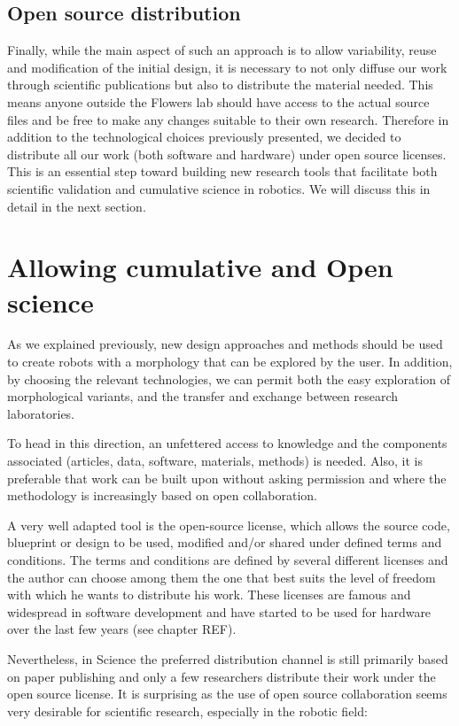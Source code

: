 \subsection{Open source distribution} %

Finally, while the main aspect of such an approach is to allow variability, reuse and modification of the initial design, it is necessary to not only diffuse our work through scientific publications but also to distribute the material needed.
This means anyone outside the Flowers lab should have access to the actual source files and be free to make any changes suitable to their own research. Therefore in addition to the technological choices previously presented, we decided to distribute all our work (both software and hardware) under open source licenses.
This is an essential step toward building new research tools that facilitate both scientific validation and cumulative science in robotics. We will discuss this in detail in the next section.


\section{Allowing cumulative and Open science} %
\label{sec:allow-cumulative-science}
As we explained previously, new design approaches and methods should be used to create robots with a morphology that can be explored by the user. In addition, by choosing the relevant technologies, we can permit both  the easy exploration of morphological variants, and the transfer and exchange between research laboratories.

To head in this direction, an unfettered access to knowledge and the components associated (articles, data, software, materials, methods) is needed. Also, it is preferable that work can be built upon without asking permission and where the methodology is increasingly based on open collaboration.

A very well adapted tool is the open-source license, which allows the source code, blueprint or design to be used, modified and/or shared under defined terms and conditions. The terms and conditions are defined by several different licenses and the author can choose among them the one that best suits the level of freedom  with which he wants to distribute his work. These licenses are famous and widespread in software development and have started to be used for hardware over the last few years (see chapter REF).

Nevertheless, in Science the preferred distribution channel is still primarily based on paper publishing and only a few researchers distribute their work under the open source license. It is surprising as the use of open source collaboration seems very desirable for scientific research, especially in the robotic field:

